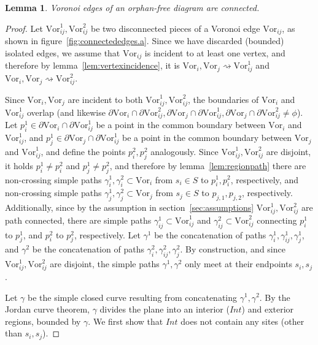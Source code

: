 \documentclass[11pt]{article}
\newtheorem{lemma}{Lemma}
\newcommand{\Sites}{S}
\newcommand{\Vor}{\text{Vor}}
\begin{document}
\begin{lemma}\label{lem:connectededges}
	Voronoi edges of an orphan-free diagram are connected. 
\end{lemma}
\begin{proof}



Let $\Vor^1_{ij},\Vor^2_{ij}$ be two disconnected pieces of a Voronoi edge $\Vor_{ij}$,
	as shown in figure~\ref{fig:connectededges.a}.
Since we have discarded (bounded) isolated edges, we assume that  
	$\Vor_{ij}$ is incident to at least one vertex, and therefore
	by lemma~\ref{lem:vertexincidence},
	 it is $\Vor_i,\Vor_j\rightsquigarrow\Vor^1_{ij}$ and $\Vor_i,\Vor_j\rightsquigarrow\Vor^2_{ij}$. 



Since $\Vor_i,\Vor_j$ are incident to both $\Vor^1_{ij},\Vor^2_{ij}$, 
	the boundaries of $\Vor_i$ and $\Vor_{ij}^1$ overlap
	(and likewise $\partial\Vor_i \cap \partial\Vor_{ij}^2, \partial\Vor_j \cap \partial\Vor_{ij}^1, \partial\Vor_j \cap \partial\Vor_{ij}^2 \ne \phi$). 
Let $p^1_i\in\partial\Vor_i\cap\partial\Vor^1_{ij}$ 
	be a point in the common boundary between $\Vor_i$ and $\Vor^1_{ij}$, 
	and $p^1_j\in\partial\Vor_j\cap\partial\Vor^1_{ij}$ be a point in the common boundary between $\Vor_j$ and $\Vor^1_{ij}$, 
	and define the points $p^2_i,p^2_j$ analogously.
Since $\Vor^1_{ij},\Vor^2_{ij}$ are disjoint, 
	it holds $p^1_i\ne p^2_i$ and $p^1_j\ne p^2_j$, 
	and therefore by lemma~\ref{lem:regionpath}
		 there are non-crossing simple paths $\gamma^1_i,\gamma^2_i\subset\Vor_i$ 
		 	from $s_i\in\Sites$ to $p^1_i,p^2_i$, respectively, 	
		 and non-crossing simple paths $\gamma^1_j,\gamma^2_j\subset\Vor_j$ 
		 	from $s_j\in\Sites$ to $p_{j,1},p_{j,2}$, respectively. 
Additionally, since by the assumption in section~\ref{sec:assumptions} $\Vor^1_{ij},\Vor^2_{ij}$ are path connected, 
	there are simple paths $\gamma^1_{ij}\subset\Vor^1_{ij}$ and $\gamma^2_{ij}\subset\Vor^2_{ij}$
	connecting $p^1_i$ to $p^1_j$, and $p^2_i$ to $p^2_j$, respectively. 
Let $\gamma^1$ be the concatenation of paths $\gamma^1_i,\gamma^1_{ij},\gamma^1_j$, 
	and $\gamma^2$ be the concatenation of paths $\gamma^2_i,\gamma^2_{ij},\gamma^2_j$. 
By construction, and since $\Vor^1_{ij},\Vor^2_{ij}$ are disjoint, 
	the simple paths $\gamma^1,\gamma^2$ only meet at their endpoints $s_i,s_j$. 



Let $\gamma$ be the simple closed curve resulting from concatenating $\gamma^1,\gamma^2$. 
By the Jordan curve theorem, $\gamma$ divides the plane into an interior ($Int$) and exterior regions, bounded by $\gamma$. 
We first show that $Int$ does not contain any sites (other than $s_i,s_j$). 



\end{proof}
\end{document}
